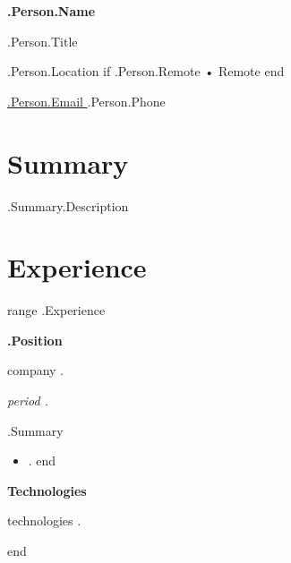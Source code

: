 \documentclass[11pt,a4paper]{article}
\begin{document}

{\Huge\textbf{ {{ .Person.Name }} }}

\vspace{4pt}

{\large {{ .Person.Title }}}

\vspace{8pt}

{{ .Person.Location }}
{{ if .Person.Remote }} • Remote{{ end }}

\href{mailto:{{ .Person.Email }}}{{ .Person.Email }}
\hfill
{{ .Person.Phone }}


\section*{Summary}

{{ .Summary.Description }}


\section*{Experience}

{{ range .Experience }}

\textbf{ {{ .Position }} }

{{ company . }}

\emph{ {{ period . }} }

{{ .Summary }}

\begin{itemize}

{{ range .Responsibilities }}
\item {{ . }}
{{ end }}

\end{itemize}

\textbf{Technologies}

{{ technologies . }}

\vspace{1em}

{{ end }}

\end{document}

